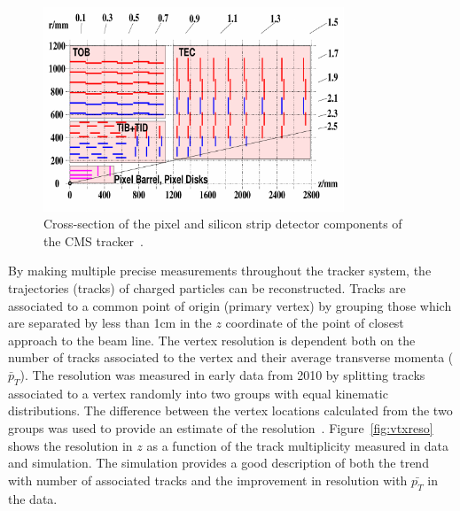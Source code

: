\begin{figure}
	\centering
	\includegraphics[width=0.8\textwidth]{detector/trcker/trcker.pdf}
	\caption{Cross-section of the pixel and silicon strip detector 
	components of the CMS tracker~\citep{Weber201159}.}
   \label{fig:trackergeom}
\end{figure}

By making multiple precise measurements throughout the tracker system, the trajectories (tracks) of charged 
particles can be reconstructed.
Tracks are associated to a common point of origin (primary vertex) by grouping those which are separated
by less than 1cm in the $z$ coordinate of the point of closest approach to the beam line.
The vertex resolution is dependent both on the number of tracks associated to the vertex and
their average transverse momenta ($\bar{p}_{T}$). The resolution was measured in early data from 2010
by splitting tracks associated to a vertex randomly into two groups with equal kinematic distributions.
The difference between the vertex locations calculated from the two groups was used to provide an estimate 
of the resolution~\citep{TRK-10-005}.
Figure~\ref{fig:vtxreso} shows the resolution in $z$ as a function of the track multiplicity
measured in data and simulation. The simulation provides a good description of both the trend with 
number of associated tracks and the improvement in resolution with $\bar{p_{T}}$ in the data. 

